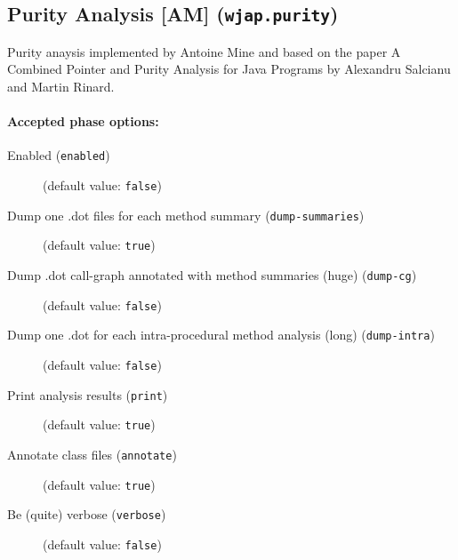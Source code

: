 \documentclass{article}
\begin{document}
\subsection{Purity Analysis [AM] ({\tt wjap.purity})}

Purity anaysis implemented by Antoine Mine and based on the paper
A Combined Pointer and Purity Analysis for Java Programs by 
Alexandru Salcianu and Martin Rinard.
                    

\paragraph{Accepted phase options:} 

\begin{description}

\item[Enabled ({\tt enabled})]
(default value: {\tt false})






\item[Dump one .dot files for each method summary ({\tt dump-summaries})]
(default value: {\tt true})






\item[Dump .dot call-graph annotated with method summaries (huge) ({\tt dump-cg})]
(default value: {\tt false})






\item[Dump one .dot for each intra-procedural method analysis (long) ({\tt dump-intra})]
(default value: {\tt false})






\item[Print analysis results ({\tt print})]
(default value: {\tt true})






\item[Annotate class files ({\tt annotate})]
(default value: {\tt true})






\item[Be (quite) verbose ({\tt verbose})]
(default value: {\tt false})






\end{description}
\end{document}
